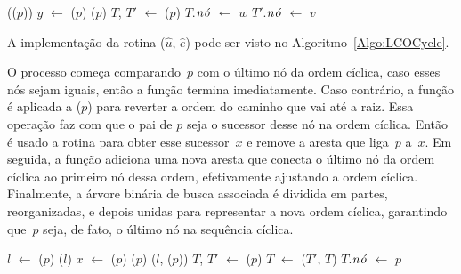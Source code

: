 \begin{algorithm}[htb]
\caption{\LCOSplit($p$)}
\label{Algo:LCOSplit}
\begin{algorithmic}[1]
\State \linkcutEvert(\treapLast($p$))
\State $y$ $\gets$ \linkcutParent($p$)
\State \linkcutDelEdge($p$)
\State $T$, $T'$ $\gets$ \treapSplitRight($p$)
\State $T$.$\mathit{n\acute{o}}$ $\gets$ $w$
\State $T'$.$\mathit{n\acute{o}}$ $\gets$ $v$
\end{algorithmic}
\end{algorithm}


A implementação da rotina \LCOCycle($\hat u$, $\hat e$) pode ser visto no Algoritmo~\ref{Algo:LCOCycle}.

O processo começa comparando~$p$ com o último nó da ordem cíclica, caso esses nós sejam iguais, então a função termina imediatamente.
Caso contrário, a função \linkcutEvert{} é aplicada a \treapLast($p$) para reverter a ordem do caminho que vai até a raiz.
Essa operação faz com que o pai de $p$ seja o sucessor desse nó na ordem cíclica.
Então é usado a rotina \linkcutParent{} para obter esse sucessor~$x$ e remove a aresta que liga~$p$ a~$x$.
Em seguida, a função \linkcutAddEdge adiciona uma nova aresta que conecta o último nó da ordem cíclica ao primeiro nó dessa ordem, efetivamente ajustando a ordem cíclica.
Finalmente, a árvore binária de busca associada é dividida em partes, reorganizadas, e depois unidas para representar a nova ordem cíclica, garantindo que~$p$ seja, de fato, o último nó na sequência cíclica.


\begin{algorithm}[htb]
\caption{\LCOCycle($p$)}
\label{Algo:LCOCycle}
\begin{algorithmic}[1]
\State $l$ $\gets$ \treapLast($p$)
\State\Return
\EndIf
\State \linkcutEvert($l$)
\State $x$ $\gets$ \linkcutParent($p$)
\State \linkcutDelEdge($p$)
\State \linkcutAddEdge($l$, \treapFirst($p$))
\State $T$, $T'$ $\gets$ \treapSplitRight($p$)
\State $T$ $\gets$ \treapJoin($T'$, $T$)
\State $T$.$\mathit{n\acute{o}}$ $\gets$ $p$
\end{algorithmic}
\end{algorithm}
